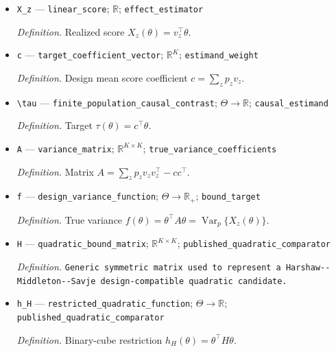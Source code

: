 \documentclass{article}
\begin{document}
\begin{itemize}
  \par\smallskip\noindent\emph{Definition.} Subspace generated by observable monomials of degree at most \(r\).
  \item \texttt{X\_\allowbreak{}z} --- \texttt{linear\_\allowbreak{}score}; \(\mathbb R\); \texttt{effect\_\allowbreak{}estimator}
  \par\smallskip\noindent\emph{Definition.} Realized score \(X_z(\theta)=v_z^\top\theta\).
  \item \texttt{c} --- \texttt{target\_\allowbreak{}coefficient\_\allowbreak{}vector}; \(\mathbb R^K\); \texttt{estimand\_\allowbreak{}weight}
  \par\smallskip\noindent\emph{Definition.} Design mean score coefficient \(c=\sum_z p_zv_z\).
  \item \texttt{\textbackslash{}\allowbreak{}tau} --- \texttt{finite\_\allowbreak{}population\_\allowbreak{}causal\_\allowbreak{}contrast}; \(\Theta\to\mathbb R\); \texttt{causal\_\allowbreak{}estimand}
  \par\smallskip\noindent\emph{Definition.} Target \(\tau(\theta)=c^\top\theta\).
  \item \texttt{A} --- \texttt{variance\_\allowbreak{}matrix}; \(\mathbb R^{K\times K}\); \texttt{true\_\allowbreak{}variance\_\allowbreak{}coefficients}
  \par\smallskip\noindent\emph{Definition.} Matrix \(A=\sum_zp_zv_zv_z^\top-cc^\top\).
  \item \texttt{f} --- \texttt{design\_\allowbreak{}variance\_\allowbreak{}function}; \(\Theta\to\mathbb R_+\); \texttt{bound\_\allowbreak{}target}
  \par\smallskip\noindent\emph{Definition.} True variance \(f(\theta)=\theta^\top A\theta=\operatorname{Var}_p\{X_z(\theta)\}\).
  \item \texttt{H} --- \texttt{quadratic\_\allowbreak{}bound\_\allowbreak{}matrix}; \(\mathbb R^{K\times K}\); \texttt{published\_\allowbreak{}quadratic\_\allowbreak{}comparator}
  \par\smallskip\noindent\emph{Definition.} \texttt{Generic symmetric matrix used to represent a Harshaw-\allowbreak{}-\allowbreak{}Middleton-\allowbreak{}-\allowbreak{}Savje design-\allowbreak{}compatible quadratic candidate.}
  \item \texttt{h\_\allowbreak{}H} --- \texttt{restricted\_\allowbreak{}quadratic\_\allowbreak{}function}; \(\Theta\to\mathbb R\); \texttt{published\_\allowbreak{}quadratic\_\allowbreak{}comparator}
  \par\smallskip\noindent\emph{Definition.} Binary-cube restriction \(h_H(\theta)=\theta^\top H\theta\).

\end{itemize}
\end{document}
